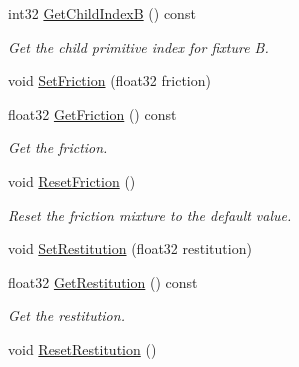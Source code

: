\begin{DoxyCompactItemize}
\item 
int32 \hyperlink{classb2_contact_a9edc26022c3d1a9cf1dab9d79d639b3f}{Get\+Child\+IndexB} () const \hypertarget{classb2_contact_a9edc26022c3d1a9cf1dab9d79d639b3f}{}\label{classb2_contact_a9edc26022c3d1a9cf1dab9d79d639b3f}

\begin{DoxyCompactList}\small\item\em Get the child primitive index for fixture B. \end{DoxyCompactList}\item 
void \hyperlink{classb2_contact_a5e8fbb6bb2966ac84272bb0ea9d2e4c7}{Set\+Friction} (float32 friction)
\item 
float32 \hyperlink{classb2_contact_a0b6daf4137fd1719961f5d780b8dda15}{Get\+Friction} () const \hypertarget{classb2_contact_a0b6daf4137fd1719961f5d780b8dda15}{}\label{classb2_contact_a0b6daf4137fd1719961f5d780b8dda15}

\begin{DoxyCompactList}\small\item\em Get the friction. \end{DoxyCompactList}\item 
void \hyperlink{classb2_contact_ad66d9290da187cef4c9f48c5766d4460}{Reset\+Friction} ()\hypertarget{classb2_contact_ad66d9290da187cef4c9f48c5766d4460}{}\label{classb2_contact_ad66d9290da187cef4c9f48c5766d4460}

\begin{DoxyCompactList}\small\item\em Reset the friction mixture to the default value. \end{DoxyCompactList}\item 
void \hyperlink{classb2_contact_a24ca342c2bb766c53ef5ad04f5268fc1}{Set\+Restitution} (float32 restitution)
\item 
float32 \hyperlink{classb2_contact_aed12746a2855277479802144b699326b}{Get\+Restitution} () const \hypertarget{classb2_contact_aed12746a2855277479802144b699326b}{}\label{classb2_contact_aed12746a2855277479802144b699326b}

\begin{DoxyCompactList}\small\item\em Get the restitution. \end{DoxyCompactList}\item 
void \hyperlink{classb2_contact_a243501bc5c146e9eb1296162d328aef1}{Reset\+Restitution} ()\hypertarget{classb2_contact_a243501bc5c146e9eb1296162d328aef1}{}\label{classb2_contact_a243501bc5c146e9eb1296162d328aef1}


\end{DoxyCompactItemize}
